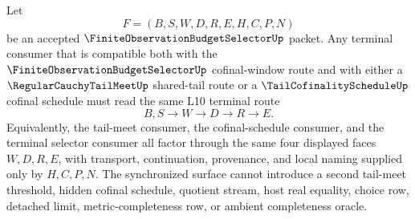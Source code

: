 \begin{theorem}
\label{thm:finite-observation-budget-selector-terminal-tail-meet-synchronization}
Let
$$
F=(B,S,W,D,R,E,H,C,P,N)
$$
be an accepted $\FiniteObservationBudgetSelectorUp$ packet. Any terminal consumer that is compatible both with the $\FiniteObservationBudgetSelectorUp$ cofinal-window route and with either a $\RegularCauchyTailMeetUp$ shared-tail route or a $\TailCofinalityScheduleUp$ cofinal schedule must read the same L10 terminal route
$$
B,S \to W \to D \to R \to E.
$$
Equivalently, the tail-meet consumer, the cofinal-schedule consumer, and the terminal selector consumer all factor through the same four displayed faces $W,D,R,E$, with transport, continuation, provenance, and local naming supplied only by $H,C,P,N$. The synchronized surface cannot introduce a second tail-meet threshold, hidden cofinal schedule, quotient stream, host real equality, choice row, detached limit, metric-completeness row, or ambient completeness oracle.
\end{theorem}
